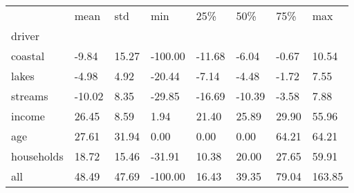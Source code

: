 \begin{tabular}{llllllll}
\toprule
 & mean & std & min & 25\% & 50\% & 75\% & max \\
driver &  &  &  &  &  &  &  \\
\midrule
coastal & -9.84 & 15.27 & -100.00 & -11.68 & -6.04 & -0.67 & 10.54 \\
lakes & -4.98 & 4.92 & -20.44 & -7.14 & -4.48 & -1.72 & 7.55 \\
streams & -10.02 & 8.35 & -29.85 & -16.69 & -10.39 & -3.58 & 7.88 \\
income & 26.45 & 8.59 & 1.94 & 21.40 & 25.89 & 29.90 & 55.96 \\
age & 27.61 & 31.94 & 0.00 & 0.00 & 0.00 & 64.21 & 64.21 \\
households & 18.72 & 15.46 & -31.91 & 10.38 & 20.00 & 27.65 & 59.91 \\
all & 48.49 & 47.69 & -100.00 & 16.43 & 39.35 & 79.04 & 163.85 \\
\bottomrule
\end{tabular}
